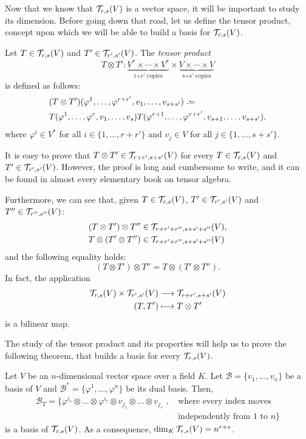 Now that we know that ${\mathcal T}_{r,s}(V)$ is a vector space, it will be important to study its dimension. Before going down that road, let us define the tensor product, concept upon which we will be able to build a basis for ${\mathcal T}_{r,s}(V)$.

\begin{definition}
	Let $T \in {\mathcal T}_{r,s}(V)$ and $T' \in {\mathcal T}_{r',s'}(V)$. The \emph{tensor product} \[T \otimes T' \colon \underbrace{V^* \times \cdots \times V^*}_{\text{r+r' copies}} \times \underbrace{V \times \cdots \times V}_{\text{s+s' copies}}\] is defined as follows:
	\begin{align*}
		&(T \otimes T')(\varphi^1, \dots, \varphi^{r+r'}, v_1, \dots, v_{s+s'}) \defeq \\
		&T(\varphi^1, \dots, \varphi^r, v_1, \dots, v_s) T(\varphi^{r+1}, \dots, \varphi^{r+r'}, v_{s+1}, \dots, v_{s+s'}),
	\end{align*}
	where $\varphi^i \in V^*$ for all $i \in \{1,\dots,r+r'\}$ and $v_j \in V$ for all $j \in \{1,\dots,s+s'\}$.
\end{definition}

It is easy to prove that $T \otimes T' \in {\mathcal T}_{r+r',s+s'}(V)$ for every $T \in {\mathcal T}_{r,s}(V)$ and $T' \in {\mathcal T}_{r',s'}(V)$. However, the proof is long and cumbersome to write, and it can be found in almost every elementary book on tensor algebra.

Furthermore, we can see that, given $T \in {\mathcal T}_{r,s}(V)$, $T' \in {\mathcal T}_{r',s'}(V)$ and $T'' \in {\mathcal T}_{r'',s''}(V)$:
\begin{align*}
	(T \otimes T') \otimes T'' &\in {\mathcal T}_{r+r'+r'', s+s'+s''}(V),\\
	T \otimes (T' \otimes T'') &\in {\mathcal T}_{r+r'+r'', s+s'+s''}(V)
\end{align*}
and the following equality holds:
\[
	(T \otimes T') \otimes T'' = T \otimes (T' \otimes T'').
\]
In fact, the application
\begin{align*}
	{\mathcal T}_{r,s}(V) \times {\mathcal T}_{r',s'}(V) &\longrightarrow {\mathcal T}_{r+r',s+s'}(V) \\
	(T,T') &\longmapsto T \otimes T'
\end{align*}
is a bilinear map.

The study of the tensor product and its properties will help us to prove the following theorem, that builds a basis for every ${\mathcal T}_{r,s}(V)$.

\begin{theorem}
	Let $V$ be an $n$-dimensional vector space over a field $K$. Let $\mathcal{B} = \{v_1, \dots, v_n\}$ be a basis of $V$ and $\mathcal{B^*} = \{\varphi^1, \dots, \varphi^n\}$ be  its dual basis. Then,
	\begin{align*}
		\mathcal{B}_T = \{\varphi^{i_1} \otimes \dots \otimes \varphi^{i_r} \otimes v_{j_1} \otimes \dots \otimes v_{j_s} \textrm{ , } &\textrm{where every index moves} \\
		&\textrm{independently from $1$ to $n$}  \}
	\end{align*}
	is a basis of ${\mathcal T}_{r,s}(V)$. As a consequence, $\dim_K{\mathcal T}_{r,s}(V) = n^{r+s}$.
\end{theorem}


